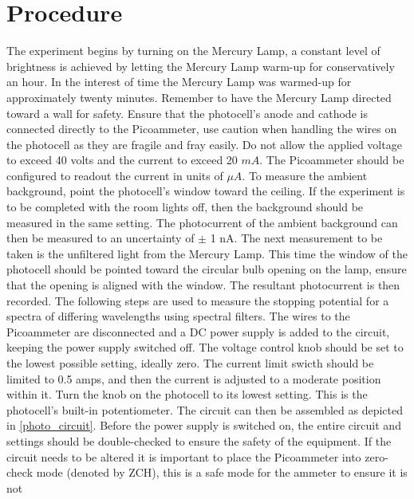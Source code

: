 \documentclass[a4paper]{article}
\begin{document}
\section{Procedure}


\qq The experiment begins by turning on the Mercury Lamp, a constant
level of brightness is achieved by letting the Mercury Lamp warm-up
for conservatively an hour. In the interest of time the Mercury Lamp
was warmed-up for approximately twenty minutes. Remember to have the
Mercury Lamp directed toward a wall for safety. Ensure that the
photocell's anode and cathode is connected directly to the
Picoammeter, use caution when handling the wires on the photocell as
they are fragile and fray easily. Do not allow the applied voltage to
exceed 40 volts and the current to exceed 20 $mA$. The
Picoammeter should be configured to readout the current in units of
$\mu A$. To measure the ambient background, point the photocell's
window toward the ceiling. If the experiment is to be completed with
the room lights off, then the background should be measured in the
same setting. The photocurrent of the ambient background can then be
measured to an uncertainty of $\pm$ 1 nA. The next measurement to
be taken is the unfiltered light from the Mercury Lamp. This time the
window of the photocell should be pointed toward the circular bulb
opening on the lamp, ensure that the opening is aligned with the
window. The resultant photocurrent is then recorded. The following
steps are used to measure the stopping potential for a spectra of
differing wavelengths using spectral filters. The wires to the
Picoammeter are disconnected and a DC power supply is added to the
circuit, keeping the power supply switched off. The voltage control
knob should be set to the lowest possible setting, ideally zero. The
current limit swicth should be limited to 0.5 amps, and then the
current is adjusted to a moderate position within it. Turn the knob on
the photocell to its lowest setting. This is the photocell's built-in
potentiometer. The circuit can then be assembled as depicted in
\ref{photo_circuit}. Before the power supply is switched on, the
entire circuit and settings should be double-checked to ensure the
safety of the equipment. If the circuit needs to be altered it is
important to place the Picoammeter into zero-check mode (denoted by
ZCH), this is a safe mode for the ammeter to ensure it is not
\end{document}
